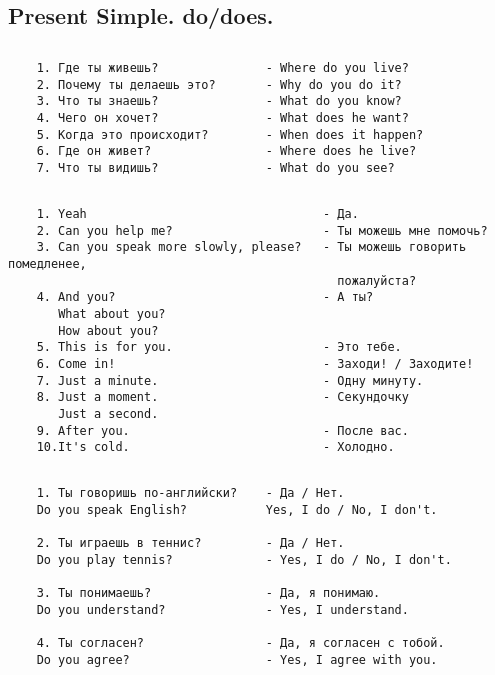 \subsection{Present Simple. do/does.}
\subsection*{}
\begin{verbatim}
    1. Где ты живешь?               - Where do you live?
    2. Почему ты делаешь это?       - Why do you do it?
    3. Что ты знаешь?               - What do you know?
    4. Чего он хочет?               - What does he want?
    5. Когда это происходит?        - When does it happen?
    6. Где он живет?                - Where does he live?
    7. Что ты видишь?               - What do you see?
\end{verbatim}

\subsection*{}
\begin{verbatim}
    1. Yeah                                 - Да.
    2. Can you help me?                     - Ты можешь мне помочь?
    3. Can you speak more slowly, please?   - Ты можешь говорить помедленее,
                                              пожалуйста?
    4. And you?                             - А ты?
       What about you?
       How about you?
    5. This is for you.                     - Это тебе.
    6. Come in!                             - Заходи! / Заходите!
    7. Just a minute.                       - Одну минуту.
    8. Just a moment.                       - Секундочку
       Just a second.
    9. After you.                           - После вас.
    10.It's cold.                           - Холодно.
\end{verbatim}

\subsection*{}
\begin{verbatim}
    1. Ты говоришь по-английски?    - Да / Нет.
    Do you speak English?           Yes, I do / No, I don't.

    2. Ты играешь в теннис?         - Да / Нет.
    Do you play tennis?             - Yes, I do / No, I don't.

    3. Ты понимаешь?                - Да, я понимаю.
    Do you understand?              - Yes, I understand.

    4. Ты согласен?                 - Да, я согласен с тобой.
    Do you agree?                   - Yes, I agree with you.
\end{verbatim}


